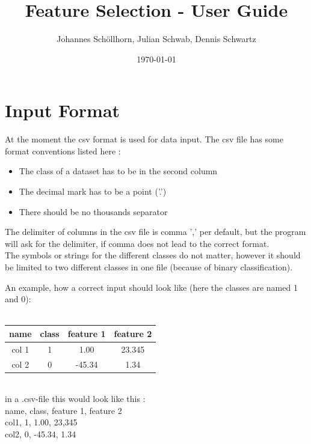 \documentclass[headsepline,12pt,a4paper]{scrartcl}
\begin{document}
\begin{titlepage}
  \author{Johannes Schöllhorn, Julian Schwab, Dennis Schwartz}
  \title{Feature Selection - User Guide}
  \date{\today}
  \maketitle
\end{titlepage}


\tableofcontents

\newpage

\section{Input Format}

At the moment the csv format is used for data input. The csv file has some format conventions listed here :

\begin{itemize}
\item The class of a dataset has to be in the second column
\item The decimal mark has to be a point ('.')
\item There should be no thousands separator 
\end{itemize}

The delimiter of columns in the csv file is comma ',' per default, but the program will ask for the delimiter, if comma does not lead to the correct format.\\
The symbols or strings for the different classes do not matter, however it should be limited to two different classes in one file (because of binary classification).

An example, how a correct input should look like (here the classes are named 1 and 0): \\ \\
\begin{tabular}[h]{| c | c | c | c |}
  \hline
name & class & feature 1 & feature 2 \\
\hline
col 1 & 1 & 1.00 & 23.345 \\
\hline
col 2 & 0 & -45.34 & 1.34 \\
\hline
\end{tabular} \\
 
in a .csv-file this would look like this : \\

name, class, feature 1, feature 2\\
col1, 1, 1.00, 23,345\\
col2, 0, -45.34, 1.34\\
\end{document}
